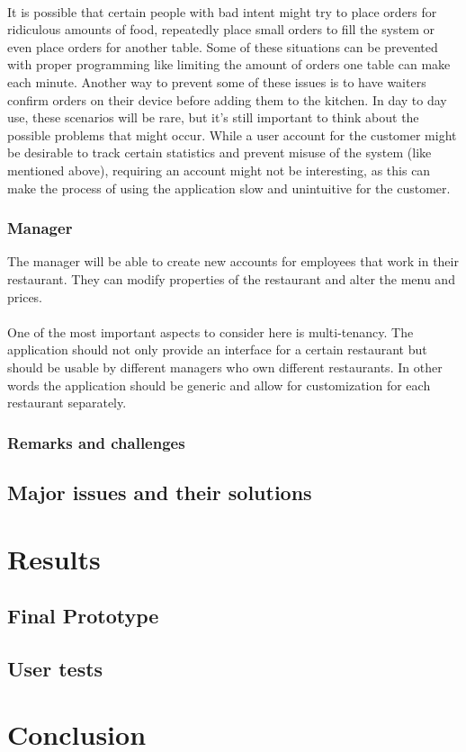 \documentclass[12pt]{article}
\newenvironment{Figure}
	{\par\medskip\noindent\minipage{\linewidth}}
	{\endminipage\par\medskip}
\begin{document}
\begin{multicols}{2}
\begin{Figure}
	\label{fig:waitercustomer}
\end{Figure}
\noindent \\It is possible that certain people with bad intent might try to place orders for ridiculous amounts of food, repeatedly place small orders to fill the system or even place orders for another table. Some of these situations can be prevented with proper programming like limiting the amount of orders one table can make each minute. Another way to prevent some of these issues is to have waiters confirm orders on their device before adding them to the kitchen. In day to day use, these scenarios will be rare, but it’s still important to think about the possible problems that might occur. While a user account for the customer might be desirable to track certain statistics and prevent misuse of the system (like mentioned above), requiring an account might not be interesting, as this can make the process of using the application slow and unintuitive for the customer.


\subsubsection{Manager}
The manager will be able to create new accounts for employees that work in their restaurant. They can modify properties of the restaurant and alter the menu and prices. 
\\\\
One of the most important aspects to consider here is multi-tenancy. The application should not only provide an interface for a certain restaurant but should be usable by different managers who own different restaurants. In other words the application should be generic and allow for customization for each restaurant separately.
\subsubsection{Remarks and challenges}
\subsection{Major issues and their solutions}

\section{Results}
\subsection{Final Prototype}
\subsection{User tests}

\section{Conclusion}


\end{multicols}
\end{document}
